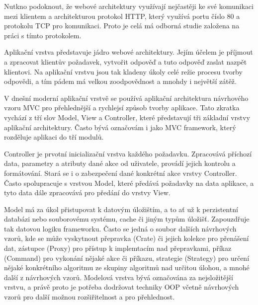 \documentclass[12pt]{article}
\begin{document}
\obrazek
{}

Nutkno podoknout, že webové architektury využívají nejčastěji ke své komunikaci mezi klientem a architekturou protokol HTTP, který využívá portu číslo 80 a protokolu TCP pro komunikaci. Proto je celá má odborná studie založena na práci s tímto protokolem.


Aplikační vrstva představuje jádro webové architektury. Jejím účelem je příjmout a zpracovat klientův požadavek, vytvořit odpověď a tuto odpověď zaslat nazpět klientovi. Na aplikační vrstvu jsou tak kladeny úkoly celé režie procesu tvorby odpovědi, a tím pádem má velkou zoodpovědnost a mnohdy i největší zátěž.

V dnešní moderní aplikační vrstvě se používá aplikační architektura návrhového vzoru MVC pro přehlednější a rychlejsí způsob tvorby aplikace. Tato zkratka vychází z tří slov Model, View a Controller, které představují tři základní vrstvy aplikační architektury. Často bývá označovám i jako MVC framework, který rozděluje aplikaci do tří modulů. \cite{design-patterns}

Controller je prvotní inicializační vrstva každého požadavku. Zpracovává příchozí data, parametry a atributy dané akce od uživatele, provádí jejich kontrolu a formátování. Stará se i o zabezpečení dané konkrétní akce vrstvy Controller. Často spolupracuje s vrstvou Model, které předává požadavky na data aplikace, a tyto data dále zpracovává pro předání do vrstvy View. \cite{design-patterns}

Model má za úkol přistupovat k datovým úložištím, a to ať už k perzistentní databázi nebo souborovému systému, cache či jiným typům úložišť. Zapouzdřuje tak datovou logiku frameworku. Často se jedná o soubor dalších návrhových vzorů, kde se může vyskytnout přepravka (Crate) či jejich kolekce pro přenášení dat, zástupce (Proxy) pro přístup k implemtacím nad přepravkami, příkaz (Command) pro vykonání nějaké akce či příkazu, strategie (Strategy) pro určení nějaké konkrétního algoritmu ze skupiny algoritmů nad určitou úlohou, a mnohé další z návrhových vzorů. Modelová vrstva bývá označována za nejsložitější vrstvu, a právě proto je potřeba dodržovat techniky OOP včetně návrhových vzorů pro další možnou rozšiřitelnost a pro přehlednost. \cite{design-patterns}
\end{document}
